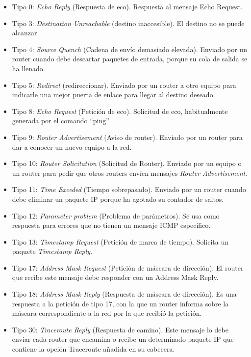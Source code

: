 \documentclass[a4paper,12pt]{article}
\begin{document}
\begin{enumerate}
 \begin{itemize}
  \item Tipo 0: \textit{Echo Reply} (Respuesta de eco). Respuesta al mensaje Echo Request.
  \item Tipo 3: \textit{Destination Unreachable} (destino inaccesible). El destino no se puede alcanzar.
  \item Tipo 4: \textit{Source Quench} (Cadena de envío demasiado elevada). Enviado por un router cuando debe descartar paquetes de entrada, porque su cola de salida se ha llenado.
  \item Tipo 5: \textit{Redirect} (redireccionar). Enviado por un router a otro equipo para indicarle una mejor puerta de enlace para llegar al destino deseado.
  \item Tipo 8: \textit{Echo Request} (Petición de eco). Solicitud de eco, habitualmente generada por el comando ``ping''
  \item Tipo 9: \textit{Router Advertisement} (Aviso de router). Enviado por un router para dar a conocer un nuevo equipo a la red.
  \item Tipo 10: \textit{Router Solicitation} (Solicitud de Router). Enviado por un equipo o un router para pedir que otros routers envíen mensajes \textit{Router Advertisement}.
  \item Tipo 11: \textit{Time Exceded} (Tiempo sobrepasado). Enviado por un router cuando debe eliminar un paquete IP porque ha agotado su contador de saltos.
  \item Tipo 12: \textit{Parameter problem} (Problema de parámetros). Se usa como respuesta para errores que no tienen un mensaje ICMP específico.
  \item Tipo 13: \textit{Timestamp Request} (Petición de marca de tiempo). Solicita un paquete \textit{Timestamp Reply}.
  \item Tipo 17: \textit{Address Mask Request} (Petición de máscara de dirección). El router que recibe este mensaje debe responder con un Address Mask Reply.
  \item Tipo 18: \textit{Address Mask Reply} (Respuesta de máscara de dirección). Es una respuesta a la petición de tipo 17, con la que un router informa sobre la máscara correspondiente a la red por la que recibió la petición.
  \item Tipo 30: \textit{Traceroute Reply} (Respuesta de camino). Este mensaje lo debe enviar cada router que encamina o recibe un determinado paquete IP que contiene la opción Traceroute añadida en su cabecera.
 \end{itemize}


\end{enumerate}
\end{document}
